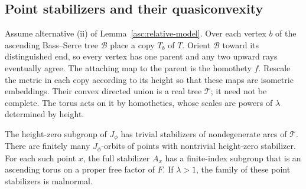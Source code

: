 \subsection{Point stabilizers and their quasiconvexity}

Assume alternative (ii) of Lemma~\ref{asc:relative-model}. Over each
vertex $b$ of the ascending Bass--Serre tree $\mathcal B$ place a copy
$T_b$ of $T$. Orient $\mathcal B$ toward its distinguished end, so every
vertex has one parent and any two upward rays eventually agree. The
attaching map to the parent is the homothety $f$. Rescale the metric in
each copy according to its height so that these maps are isometric
embeddings. Their convex directed union is a real tree $\mathcal T$;
it need not be complete. The torus acts on it by homotheties, whose
scales are powers of $\lambda$ determined by height.

\begin{lemma}\label{asc:point-stabilizers}
The height-zero subgroup of $J_\phi$ has trivial stabilizers of
nondegenerate arcs of $\mathcal T$. There are finitely many
$J_\phi$-orbits of points with nontrivial height-zero stabilizer.
For each such point $x$, the full stabilizer $A_x$ has a finite-index
subgroup that is an ascending torus on a proper free factor of $F$.
If $\lambda>1$, the family of these point stabilizers is malnormal.
\end{lemma}

